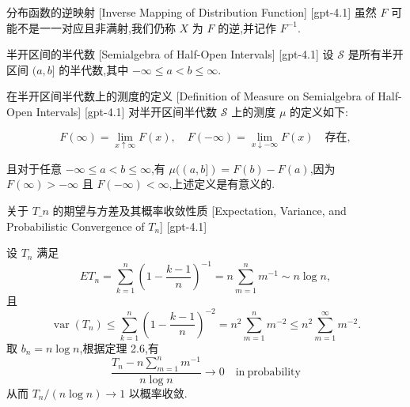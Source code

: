 \documentclass[UTF8]{ctexart}
\begin{document}
    
    
    \begin{dfn}
        {分布函数的逆映射}
        [Inverse Mapping of Distribution Function]
        [gpt-4.1]
        虽然 $F$ 可能不是一一对应且非满射,我们仍称 $X$ 为 $F$ 的逆,并记作 $F^{-1}$.
    \end{dfn}
    
    
    
    \begin{dfn}
        {半开区间的半代数}
        [Semialgebra of Half-Open Intervals]
        [gpt-4.1]
        设 $\mathcal{S}$ 是所有半开区间 $( a , b ]$ 的半代数,其中 $- \infty \leq a < b \leq \infty$.
    \end{dfn}
    
    
    
    \begin{dfn}
        {在半开区间半代数上的测度的定义}
        [Definition of Measure on Semialgebra of Half-Open Intervals]
        [gpt-4.1]
        对半开区间半代数 $\mathcal{S}$ 上的测度 $\mu$ 的定义如下:

\[
F ( \infty ) = \lim_{x \uparrow \infty} F(x), \quad F(-\infty) = \lim_{x \downarrow -\infty} F(x) \quad \text{存在},
\]

且对于任意 $- \infty \leq a < b \leq \infty$,有 $\mu((a, b]) = F(b) - F(a)$,因为 $F(\infty) > -\infty$ 且 $F(-\infty) < \infty$,上述定义是有意义的.
    \end{dfn}
    
    
    
    \begin{thm}
        {关于 $T\_n$ 的期望与方差及其概率收敛性质}
        [Expectation, Variance, and Probabilistic Convergence of $T_n$]
        [gpt-4.1]
        
设 $T_n$ 满足
\[
E T_n = \sum_{k=1}^n \left( 1 - \frac{k-1}{n} \right)^{-1} = n \sum_{m=1}^n m^{-1} \sim n \log n,
\]
且
\[
\operatorname{var}\left( T_n \right) \le \sum_{k=1}^n \left( 1 - \frac{k-1}{n} \right)^{-2} = n^2 \sum_{m=1}^n m^{-2} \le n^2 \sum_{m=1}^{\infty} m^{-2}.
\]
取 $b_n = n \log n$,根据定理 2.6,有
\[
\frac{T_n - n \sum_{m=1}^n m^{-1}}{n \log n} \to 0 \quad \mathrm{in~probability}
\]
从而 $T_n / (n \log n) \to 1$ 以概率收敛.

    \end{thm}
    
\end{document}
